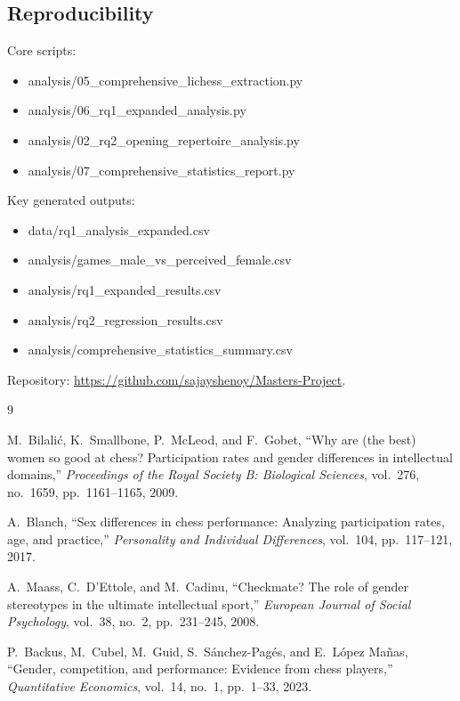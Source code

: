 \documentclass[11pt,a4paper]{article}
\begin{document}
\subsection*{Reproducibility}
{\footnotesize
Core scripts:
\begin{itemize}\setlength\itemsep{0pt}\ttfamily
  \item analysis/05\_comprehensive\_lichess\_extraction.py
  \item analysis/06\_rq1\_expanded\_analysis.py
  \item analysis/02\_rq2\_opening\_repertoire\_analysis.py
  \item analysis/07\_comprehensive\_statistics\_report.py
\end{itemize}
Key generated outputs:
\begin{itemize}\setlength\itemsep{0pt}\ttfamily
  \item data/rq1\_analysis\_expanded.csv
  \item analysis/games\_male\_vs\_perceived\_female.csv
  \item analysis/rq1\_expanded\_results.csv
  \item analysis/rq2\_regression\_results.csv
  \item analysis/comprehensive\_statistics\_summary.csv
\end{itemize}}
Repository: \url{https://github.com/sajayshenoy/Masters-Project}.

\begin{thebibliography}{9}

M.~Bilali\'c, K.~Smallbone, P.~McLeod, and F.~Gobet,
``Why are (the best) women so good at chess? Participation rates and gender differences in
intellectual domains,'' \emph{Proceedings of the Royal Society B: Biological Sciences},
vol.~276, no.~1659, pp.~1161--1165, 2009.

A.~Blanch,
``Sex differences in chess performance: Analyzing participation rates, age, and practice,''
\emph{Personality and Individual Differences}, vol.~104, pp.~117--121, 2017.

A.~Maass, C.~D'Ettole, and M.~Cadinu,
``Checkmate? The role of gender stereotypes in the ultimate intellectual sport,''
\emph{European Journal of Social Psychology}, vol.~38, no.~2, pp.~231--245, 2008.

P.~Backus, M.~Cubel, M.~Guid, S.~S\'anchez-Pag\'es, and E.~L\'opez Ma\~nas,
``Gender, competition, and performance: Evidence from chess players,''
\emph{Quantitative Economics}, vol.~14, no.~1, pp.~1--33, 2023.

\end{thebibliography}
\end{document}
